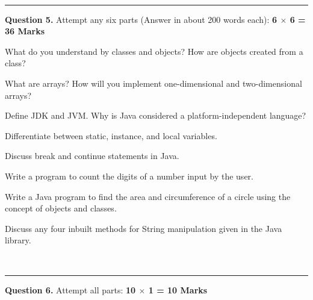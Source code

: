 \documentclass[11pt,a4paper]{article}
\begin{document}
\bigskip


\\[4pt]
\rule{\linewidth}{0.4pt}\smallskip




\noindent   \textbf{Question 5.} Attempt any six parts (Answer in about 200 words each): \hfill   \textbf{6 $ \times$ 6 = 36 Marks}

\begin{parts}
  \item What do you understand by classes and objects? How are objects created from a class?
  \item What are arrays? How will you implement one-dimensional and two-dimensional arrays?
  \item Define JDK and JVM. Why is Java considered a platform-independent language?
  \item Differentiate between static, instance, and local variables.
  \item Discuss break and continue statements in Java.
  \item Write a program to count the digits of a number input by the user.
  \item Write a Java program to find the area and circumference of a circle using the concept of objects and classes.
  \item Discuss any four inbuilt methods for String manipulation given in the Java library.
\end{parts}

\bigskip


\\[4pt]
\rule{\linewidth}{0.4pt}\smallskip




\noindent   \textbf{Question 6.} Attempt all parts: \hfill   \textbf{10 $ \times$ 1 = 10 Marks}
\end{document}
